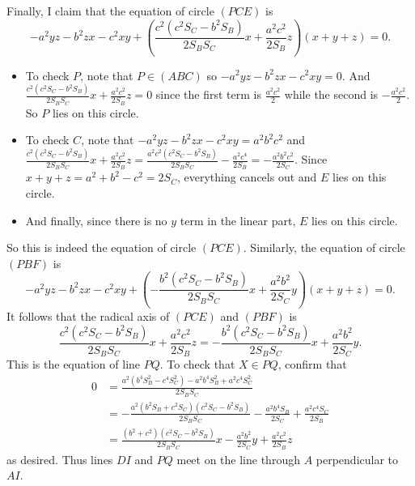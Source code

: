 Finally, I claim that the equation of circle $(PCE)$ is \[-a^2yz-b^2zx-c^2xy+\left(\frac{c^2(c^2S_C-b^2S_B)}{2S_BS_C}x+\frac{a^2c^2}{2S_B}z\right)(x+y+z)=0.\]
\begin{itemize}
	\item To check $P$, note that $P\in(ABC)$ so $-a^2yz-b^2zx-c^2xy=0$. And $\frac{c^2(c^2S_C-b^2S_B)}{2S_BS_C}x+\frac{a^2c^2}{2S_B}z=0$ since the first term is $\frac{a^2c^2}{2}$ while the second is $-\frac{a^2c^2}{2}$. So $P$ lies on this circle.
	\item To check $C$, note that $-a^2yz-b^2zx-c^2xy=a^2b^2c^2$ and $\frac{c^2(c^2S_C-b^2S_B)}{2S_BS_C}x+\frac{a^2c^2}{2S_B}z=\frac{a^2c^2(c^2S_C-b^2S_B)}{2S_BS_C}-\frac{a^2c^4}{2S_B}=-\frac{a^2b^2c^2}{2S_C}$. Since $x+y+z=a^2+b^2-c^2=2S_C$, everything cancels out and $E$ lies on this circle.
	\item And finally, since there is no $y$ term in the linear part, $E$ lies on this circle.
\end{itemize}
So this is indeed the equation of circle $(PCE)$. Similarly, the equation of circle $(PBF)$ is \[-a^2yz-b^2zx-c^2xy+\left(-\frac{b^2(c^2S_C-b^2S_B)}{2S_BS_C}x+\frac{a^2b^2}{2S_C}y\right)(x+y+z)=0.\] It follows that the radical axis of $(PCE)$ and $(PBF)$ is \[\frac{c^2(c^2S_C-b^2S_B)}{2S_BS_C}x+\frac{a^2c^2}{2S_B}z=-\frac{b^2(c^2S_C-b^2S_B)}{2S_BS_C}x+\frac{a^2b^2}{2S_C}y.\] This is the equation of line $PQ$. To check that $X\in PQ$, confirm that
\begin{align*}
	0&=\frac{a^2(b^4S_B^2-c^4S_C^2)-a^2b^4S_B^2+a^2c^4S_C^2}{2S_BS_C}\\
	&=-\frac{a^2(b^2S_B+c^2S_C)(c^2S_C-b^2S_B)}{2S_BS_C}-\frac{a^2b^4S_B}{2S_C}+\frac{a^2c^4S_C}{2S_B}\\
	&=\frac{(b^2+c^2)(c^2S_C-b^2S_B)}{2S_BS_C}x-\frac{a^2b^2}{2S_C}y+\frac{a^2c^2}{2S_B}z
\end{align*}
as desired. Thus lines $DI$ and $PQ$ meet on the line through $A$ perpendicular to $AI$.